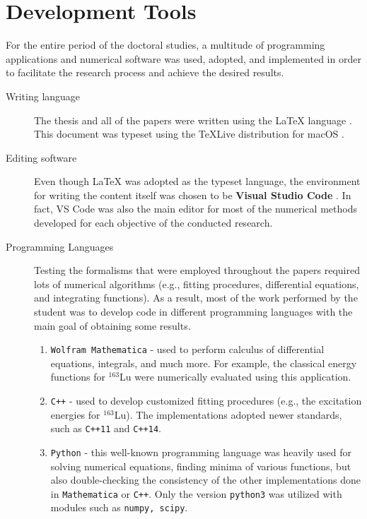 \chapter{Development Tools}
\label{appendix:dev-tools}

For the entire period of the doctoral studies, a multitude of programming applications and numerical software was used, adopted, and implemented in order to facilitate the research process and achieve the desired results.

\begin{description}
    \item[Writing language] The thesis and all of the papers were written using the \LaTeX {} language \cite{lamport1986latex}. This document was typeset using the TeXLive distribution for macOS \cite{texlivemacos}.
    \item[Editing software] Even though \LaTeX {} was adopted as the typeset language, the environment for writing the content itself was chosen to be \textbf{Visual Studio Code} \cite{vscode}. In fact, VS Code was also the main editor for most of the numerical methods developed for each objective of the conducted research.
    \item[Programming Languages] Testing the formalisms that were employed throughout the papers required lots of numerical algorithms (e.g., fitting procedures, differential equations, and integrating functions). As a result, most of the work performed by the student was to develop code in different programming languages with the main goal of obtaining some results.
    \begin{enumerate}
        \item \texttt{Wolfram Mathematica} \cite{WolframMathematica} - used to perform calculus of differential equations, integrals, and much more. For example, the classical energy functions for $^{163}$Lu were numerically evaluated using this application.
        \item \texttt{C++} - used to develop customized fitting procedures (e.g., the excitation energies for $^{163}$Lu). The implementations adopted newer standards, such as \texttt{C++11} and \texttt{C++14}.
        \item \texttt{Python} - this well-known programming language was heavily used for solving numerical equations, finding minima of various functions, but also double-checking the consistency of the other implementations done in \texttt{Mathematica} or \texttt{C++}. Only the version \texttt{python3} was utilized with modules such as \texttt{numpy, scipy}.

\end{enumerate}
\end{description}

